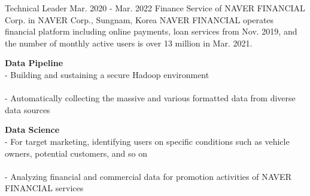 \begin{cventries}
    \cventry
        {Technical Leader} %
        {Mar. 2020 - Mar. 2022} %
        {Finance Service of NAVER FINANCIAL Corp. in NAVER Corp., } %
        {Sungnam, Korea}%
        { %
            NAVER FINANCIAL operates financial platform including online payments, loan services from Nov. 2019, and the number of monthly active users is over 13 million in Mar. 2021.
        }
        { %
            \begin{cvitems}
                \item {
                    {\bf Data Pipeline} \\
                    - Building and sustaining a secure Hadoop environment \\
                         \\
                    - Automatically collecting the massive and various formatted data from diverse data sources \\
                         \nn
                }
                \item {
                    {\bf Data Science} \\
                    - For target marketing, identifying users on specific conditions such as vehicle owners, potential customers, and so on \\
                         \\
                    - Analyzing financial and commercial data for promotion activities of NAVER FINANCIAL services \\
                         \nn
                }
            \end{cvitems}
        }


\end{cventries}
